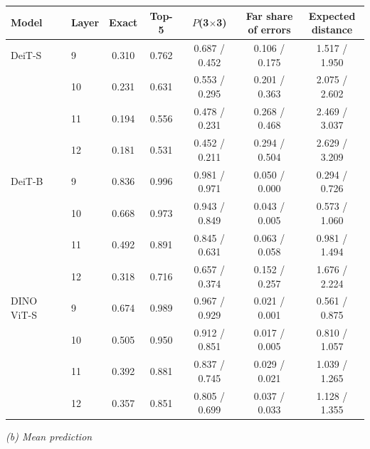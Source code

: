 \begin{tabular}{llccccc}
\toprule
Model & Layer & Exact & Top-5 & $P$(3$\times$3) & \makecell{Far share\\of errors} & \makecell{Expected\\distance} \\
\midrule
DeiT-S & 9 & 0.310 & 0.762 & 0.687 / 0.452 & 0.106 / 0.175 & 1.517 / 1.950 \\
 & 10 & 0.231 & 0.631 & 0.553 / 0.295 & 0.201 / 0.363 & 2.075 / 2.602 \\
 & 11 & 0.194 & 0.556 & 0.478 / 0.231 & 0.268 / 0.468 & 2.469 / 3.037 \\
 & 12 & 0.181 & 0.531 & 0.452 / 0.211 & 0.294 / 0.504 & 2.629 / 3.209 \\
\midrule
DeiT-B & 9 & 0.836 & 0.996 & 0.981 / 0.971 & 0.050 / 0.000 & 0.294 / 0.726 \\
 & 10 & 0.668 & 0.973 & 0.943 / 0.849 & 0.043 / 0.005 & 0.573 / 1.060 \\
 & 11 & 0.492 & 0.891 & 0.845 / 0.631 & 0.063 / 0.058 & 0.981 / 1.494 \\
 & 12 & 0.318 & 0.716 & 0.657 / 0.374 & 0.152 / 0.257 & 1.676 / 2.224 \\
\midrule
DINO ViT-S & 9 & 0.674 & 0.989 & 0.967 / 0.929 & 0.021 / 0.001 & 0.561 / 0.875 \\
 & 10 & 0.505 & 0.950 & 0.912 / 0.851 & 0.017 / 0.005 & 0.810 / 1.057 \\
 & 11 & 0.392 & 0.881 & 0.837 / 0.745 & 0.029 / 0.021 & 1.039 / 1.265 \\
 & 12 & 0.357 & 0.851 & 0.805 / 0.699 & 0.037 / 0.033 & 1.128 / 1.355 \\
\bottomrule
\end{tabular}
\par\medskip\textit{(b) Mean prediction}\par\smallskip
